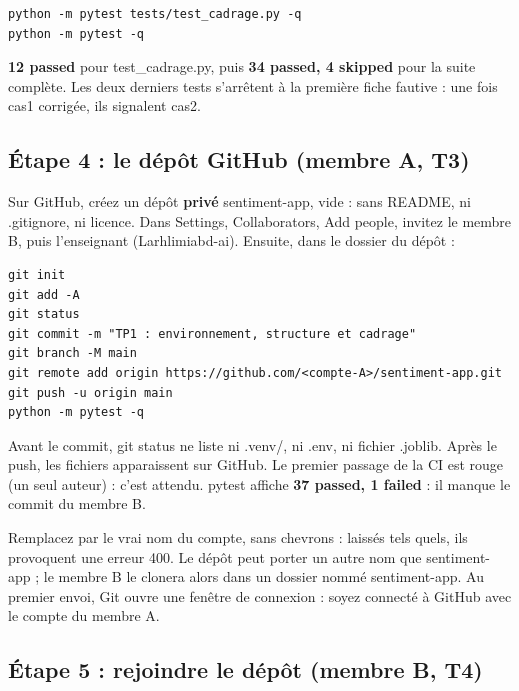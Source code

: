 \documentclass[11pt,a4paper]{article}
\newcommand{\co}[1]{{\ttfamily\hyphenchar\font=45\relax #1}}
\begin{document}
\begin{lstlisting}
python -m pytest tests/test_cadrage.py -q
python -m pytest -q
\end{lstlisting}

\begin{attendu}
\textbf{12 passed} pour \co{test\_cadrage.py}, puis \textbf{34 passed, 4 skipped} pour la suite complète.
Les deux derniers tests s'arrêtent à la première fiche fautive : une fois \co{cas1} corrigée, ils signalent
\co{cas2}.
\end{attendu}

\subsection{Étape 4 : le dépôt GitHub (membre A, T3)}

Sur GitHub, créez un dépôt \textbf{privé} \co{sentiment-app}, vide : sans README, ni \co{.gitignore}, ni
licence. Dans Settings, Collaborators, Add people, invitez le membre B, puis l'enseignant
(\co{Larhlimiabd-ai}). Ensuite, dans le dossier du dépôt :

\begin{lstlisting}
git init
git add -A
git status
git commit -m "TP1 : environnement, structure et cadrage"
git branch -M main
git remote add origin https://github.com/<compte-A>/sentiment-app.git
git push -u origin main
python -m pytest -q
\end{lstlisting}

\begin{attendu}
Avant le commit, \co{git status} ne liste ni \co{.venv/}, ni \co{.env}, ni fichier \co{.joblib}. Après le
push, les fichiers apparaissent sur GitHub. Le premier passage de la CI est rouge (un seul auteur) : c'est
attendu. pytest affiche \textbf{37 passed, 1 failed} : il manque le commit du membre B.
\end{attendu}

\begin{attention}
Remplacez \co{<compte-A>} par le vrai nom du compte, sans chevrons : laissés tels quels, ils provoquent une
erreur 400. Le dépôt peut porter un autre nom que \co{sentiment-app} ; le membre B le clonera alors dans un
dossier nommé \co{sentiment-app}. Au premier envoi, Git ouvre une fenêtre de connexion : soyez connecté à
GitHub avec le compte du membre A.
\end{attention}

\subsection{Étape 5 : rejoindre le dépôt (membre B, T4)}
\end{document}
